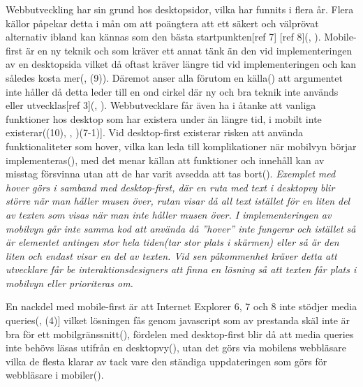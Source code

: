 \documentclass[11pt]{article}
\begin{document}
 Webbutveckling har sin grund hos desktopsidor, vilka har funnits i flera år. Flera källor påpekar detta i mån om att poängtera att ett säkert och välprövat alternativ ibland kan kännas som den bästa startpunkten[ref 7] [ref 8](\cite{armstrong}, \cite{readyartwork}). Mobile-first är en ny teknik och som kräver ett annat tänk än den vid implementeringen av en desktopsida vilket då oftast kräver längre tid vid implementeringen och kan således kosta mer(\cite{readyartwork}, \cite{marcuspope}(9)). Däremot anser alla förutom en källa(\cite{armstrong}) att argumentet inte håller då detta leder till en ond cirkel där ny och bra teknik inte används eller utvecklas[ref 3](\cite{designshack}, \cite{marcuspope}). Webbutvecklare får även ha i åtanke att vanliga funktioner hos desktop som har existera under än längre tid, i mobilt inte existerar(\cite{responsivedesign}(10), \cite{designshack}, \cite{webinsation})(7-1)]. Vid desktop-first existerar risken att använda funktionaliteter som hover, vilka kan leda till komplikationer när mobilvyn börjar implementeras(\cite{readyartwork}), med det menar källan att funktioner och innehåll kan av misstag försvinna utan att de har varit avsedda att tas bort(\cite{readyartwork}). \textit{Exemplet med hover görs i samband med desktop-first, där en ruta med text i desktopvy blir större när man håller musen över, rutan visar då all text istället för en liten del av texten som visas när man inte håller musen över. I implementeringen av mobilvyn går inte samma kod att använda då ”hover” inte fungerar och istället så är elementet antingen stor hela tiden(tar stor plats i skärmen) eller så är den liten och endast visar en del av texten. Vid sen påkommenhet kräver detta att utvecklare får be interaktionsdesigners att finna en lösning så att texten får plats i mobilvyn eller prioriteras om.}
 
 En nackdel med mobile-first är att Internet Explorer 6, 7 och 8 inte stödjer media queries(\cite{marcuspope}, \cite{neocreo}(4)] vilket lösningen fås genom javascript som av prestanda skäl inte är bra för ett mobilgränssnitt(\cite{responsivedesign}), fördelen med desktop-first blir då att media queries inte behövs läsas utifrån en desktopvy(\cite{neocreo}), utan det görs via mobilens webbläsare vilka de flesta klarar av tack vare den ständiga uppdateringen som görs för webbläsare i mobiler(\cite{webinsation}). 
 
\end{document}
